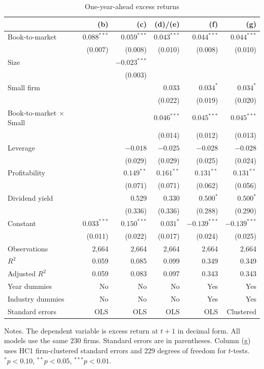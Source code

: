 \begin{table}[H]
  \centering
  \singlespacing
  \caption{One-year-ahead excess returns}
  \label{tab:regressions}
  \begin{tabular}{@{}lrrrrr@{}}
    \toprule
     & (b) & (c) & (d)/(e) & (f) & (g) \\
    \midrule
    Book-to-market & $0.088^{***}$ & $0.059^{***}$ & $0.043^{***}$ & $0.044^{***}$ & $0.044^{***}$ \\
     & (0.007) & (0.008) & (0.010) & (0.008) & (0.010) \\
    Size &  & $-0.023^{***}$ &  &  &  \\
     &  & (0.003) &  &  &  \\
    Small firm &  &  & 0.033 & $0.034^{*}$ & $0.034^{*}$ \\
     &  &  & (0.022) & (0.019) & (0.020) \\
    Book-to-market $\times$ Small &  &  & $0.046^{***}$ & $0.045^{***}$ & $0.045^{***}$ \\
     &  &  & (0.014) & (0.012) & (0.013) \\
    Leverage &  & $-0.018$ & $-0.025$ & $-0.028$ & $-0.028$ \\
     &  & (0.029) & (0.029) & (0.025) & (0.024) \\
    Profitability &  & $0.149^{**}$ & $0.161^{**}$ & $0.131^{**}$ & $0.131^{**}$ \\
     &  & (0.071) & (0.071) & (0.062) & (0.056) \\
    Dividend yield &  & 0.529 & 0.330 & $0.500^{*}$ & $0.500^{*}$ \\
     &  & (0.336) & (0.336) & (0.288) & (0.290) \\
    Constant & $0.033^{***}$ & $0.150^{***}$ & $0.031^{*}$ & $-0.139^{***}$ & $-0.139^{***}$ \\
     & (0.011) & (0.022) & (0.017) & (0.024) & (0.025) \\
    \midrule
    Observations & 2,664 & 2,664 & 2,664 & 2,664 & 2,664 \\
    $R^2$ & 0.059 & 0.085 & 0.099 & 0.349 & 0.349 \\
    Adjusted $R^2$ & 0.059 & 0.083 & 0.097 & 0.343 & 0.343 \\
    Year dummies & No & No & No & Yes & Yes \\
    Industry dummies & No & No & No & Yes & Yes \\
    Standard errors & OLS & OLS & OLS & OLS & Clustered \\
    \bottomrule
  \end{tabular}

  \medskip
  \begin{minipage}{\textwidth}
    Notes. The dependent variable is excess return at $t+1$ in decimal form. All models use the same 230 firms. Standard errors are in parentheses. Column (g) uses HC1 firm-clustered standard errors and 229 degrees of freedom for $t$-tests. $^{*}p<0.10$, $^{**}p<0.05$, $^{***}p<0.01$.
  \end{minipage}
\end{table}
